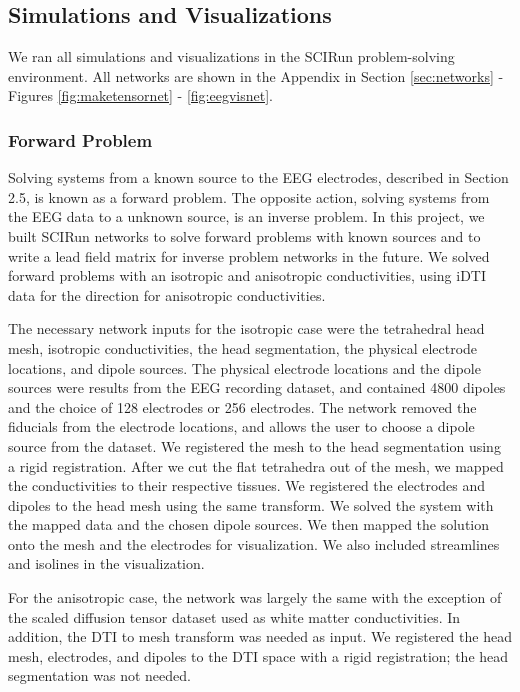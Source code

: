 \subsection{Simulations and Visualizations}
\label{sec:sim}

We ran all simulations and visualizations in the SCIRun problem-solving environment. All networks are shown in the Appendix in Section \ref{sec:networks} - Figures \ref{fig:maketensornet} - \ref{fig:eegvisnet}.

\subsubsection{Forward Problem}

Solving systems from a known source to the EEG electrodes, described in Section 2.5, is known as a forward problem. The opposite action, solving systems from the EEG data to a unknown source, is an inverse problem.  In this project, we built SCIRun networks to solve forward problems with known sources and to write a lead field matrix for inverse problem networks in the future. We solved forward problems with an isotropic and anisotropic conductivities, using iDTI data for the direction for anisotropic conductivities.

The necessary network inputs for the isotropic case were the tetrahedral head mesh, isotropic conductivities, the head segmentation, the physical electrode locations, and dipole sources. The physical electrode locations and the dipole sources were results from the EEG recording dataset, and contained 4800 dipoles and the choice of 128 electrodes or 256 electrodes. The network removed the fiducials from the electrode locations, and allows the user to choose a dipole source from the dataset. We registered the mesh to the head segmentation using a rigid registration. After we cut the flat tetrahedra out of the mesh, we mapped the conductivities to their respective tissues. We registered the electrodes and dipoles to the head mesh using the same transform. We solved the system with the mapped data and the chosen dipole sources. We then mapped the solution onto the mesh and the electrodes for visualization. We also included streamlines and isolines in the visualization.

For the anisotropic case, the network was largely the same with the exception of the scaled diffusion tensor dataset used as white matter conductivities. In addition, the DTI to mesh transform was needed as input. We registered the head mesh, electrodes, and dipoles to the DTI space with a rigid registration; the head segmentation was not needed.

